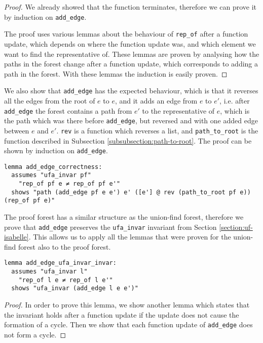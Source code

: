\begin{proof}
We already showed that the function terminates, therefore we can prove it by induction on \lstinline{add_edge}.

The proof uses various lemmas about the behaviour of \lstinline{rep_of} after a function update, which depends on where the function update was, and which element we want to find the representative of. These lemmas are proven by analysing how the paths in the forest change after a function update, which corresponds to adding a path in the forest. With these lemmas the induction is easily proven.
\end{proof}

We also show that \lstinline|add_edge| has the expected behaviour, which is that it reverses all the edges from the root of $e$ to $e$, and it adds an edge from $e$ to $e'$, i.e. after \lstinline|add_edge| the forest contains a path from $e'$ to the representative of $e$, which is the path which was there before \lstinline|add_edge|, but reversed and with one added edge between $e$ and $e'$. \lstinline|rev| is a function which reverses a list, and \lstinline|path_to_root| is the function described in Subsection \ref{subsubsection:path-to-root}. The proof can be shown by induction on \lstinline|add_edge|.

\begin{lstlisting}
lemma add_edge_correctness:
  assumes "ufa_invar pf"
    "rep_of pf e ≠ rep_of pf e'"
  shows "path (add_edge pf e e') e' ([e'] @ rev (path_to_root pf e)) (rep_of pf e)"
\end{lstlisting}

The proof forest has a similar structure as the union-find forest, therefore we prove that \lstinline|add_edge| preserves the \lstinline|ufa_invar| invariant from Section \ref{section:uf-isabelle}. This allows us to apply all the lemmas that were proven for the union-find forest also to the proof forest.

\begin{lstlisting}
lemma add_edge_ufa_invar_invar:
  assumes "ufa_invar l"
    "rep_of l e ≠ rep_of l e'"
  shows "ufa_invar (add_edge l e e')"
\end{lstlisting}

\begin{proof}
In order to prove this lemma, we show another lemma which states that the invariant holds after a function update if the update does not cause the formation of a cycle. Then we show that each function update of \lstinline{add_edge} does not form a cycle.
\end{proof}

